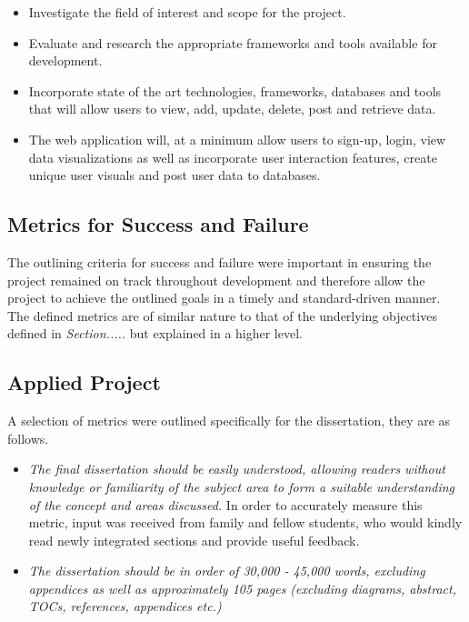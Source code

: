 \begin{itemize}
  \item Investigate the field of interest and scope for the project.
  \item Evaluate and research the appropriate frameworks and tools available for development.
  \item Incorporate state of the art technologies, frameworks, databases and tools that will allow users to view, add, update, delete, post and retrieve data.
  \item The web application will, at a minimum allow users to sign-up, login, view data visualizations as well as incorporate user interaction features, create unique user visuals and post user data to databases. 
\end{itemize}

\subsection{Metrics for Success and Failure}
The outlining criteria for success and failure were important in ensuring the project remained on track throughout development and therefore allow the project to achieve the outlined goals in a timely and standard-driven manner. The defined metrics are of similar nature to that of the underlying objectives defined in \emph{Section.....} but explained in a higher level.

\vspace{5mm} %

\subsection{Applied Project}
A selection of metrics were outlined specifically for the dissertation, they are as follows.

\begin{itemize}

    \item \emph{The final dissertation should be easily understood, allowing readers without knowledge or familiarity of the subject area to form a suitable understanding of the concept and areas discussed.} In order to accurately measure this metric, input was received from family and fellow students, who would kindly read newly integrated sections and provide useful feedback.

    \item \emph{The  dissertation should be in order of 30,000 - 45,000 words, excluding appendices as well as approximately 105 pages (excluding diagrams, abstract, TOCs, references, appendices etc.)}
    
\end{itemize}

